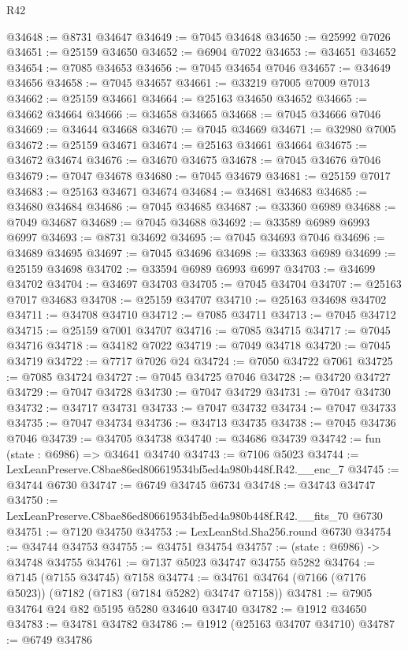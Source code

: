 \begin{lexlean}{R42}
\begin{coremodule}
{@34648 := @8731 @34647
@34649 := @7045 @34648
@34650 := @25992 @7026
@34651 := @25159 @34650
@34652 := @6904 @7022
@34653 := @34651 @34652
@34654 := @7085 @34653
@34656 := @7045 @34654 @7046
@34657 := @34649 @34656
@34658 := @7045 @34657
@34661 := @33219 @7005 @7009 @7013
@34662 := @25159 @34661
@34664 := @25163 @34650 @34652
@34665 := @34662 @34664
@34666 := @34658 @34665
@34668 := @7045 @34666 @7046
@34669 := @34644 @34668
@34670 := @7045 @34669
@34671 := @32980 @7005
@34672 := @25159 @34671
@34674 := @25163 @34661 @34664
@34675 := @34672 @34674
@34676 := @34670 @34675
@34678 := @7045 @34676 @7046
@34679 := @7047 @34678
@34680 := @7045 @34679
@34681 := @25159 @7017
@34683 := @25163 @34671 @34674
@34684 := @34681 @34683
@34685 := @34680 @34684
@34686 := @7045 @34685
@34687 := @33360 @6989
@34688 := @7049 @34687
@34689 := @7045 @34688
@34692 := @33589 @6989 @6993 @6997
@34693 := @8731 @34692
@34695 := @7045 @34693 @7046
@34696 := @34689 @34695
@34697 := @7045 @34696
@34698 := @33363 @6989
@34699 := @25159 @34698
@34702 := @33594 @6989 @6993 @6997
@34703 := @34699 @34702
@34704 := @34697 @34703
@34705 := @7045 @34704
@34707 := @25163 @7017 @34683
@34708 := @25159 @34707
@34710 := @25163 @34698 @34702
@34711 := @34708 @34710
@34712 := @7085 @34711
@34713 := @7045 @34712
@34715 := @25159 @7001 @34707
@34716 := @7085 @34715
@34717 := @7045 @34716
@34718 := @34182 @7022
@34719 := @7049 @34718
@34720 := @7045 @34719
@34722 := @7717 @7026 @24
@34724 := @7050 @34722 @7061
@34725 := @7085 @34724
@34727 := @7045 @34725 @7046
@34728 := @34720 @34727
@34729 := @7047 @34728
@34730 := @7047 @34729
@34731 := @7047 @34730
@34732 := @34717 @34731
@34733 := @7047 @34732
@34734 := @7047 @34733
@34735 := @7047 @34734
@34736 := @34713 @34735
@34738 := @7045 @34736 @7046
@34739 := @34705 @34738
@34740 := @34686 @34739
@34742 := fun (state : @6986) => @34641 @34740
@34743 := @7106 @5023
@34744 := LexLeanPreserve.C8bae86ed806619534bf5ed4a980b448f.R42.__enc_7
@34745 := @34744 @6730
@34747 := @6749 @34745 @6734
@34748 := @34743 @34747
@34750 := LexLeanPreserve.C8bae86ed806619534bf5ed4a980b448f.R42.__fits_70 @6730
@34751 := @7120 @34750
@34753 := LexLeanStd.Sha256.round @6730
@34754 := @34744 @34753
@34755 := @34751 @34754
@34757 := (state : @6986) -> @34748 @34755
@34761 := @7137 @5023 @34747 @34755 @5282
@34764 := @7145 (@7155 @34745) @7158
@34774 := @34761 @34764 (@7166 (@7176 @5023)) (@7182 (@7183 (@7184 @5282) @34747 @7158))
@34781 := @7905 @34764 @24 @82 @5195 @5280 @34640 @34740
@34782 := @1912 @34650
@34783 := @34781 @34782
@34786 := @1912 (@25163 @34707 @34710)
@34787 := @6749 @34786
}
\end{coremodule}
\end{lexlean}
